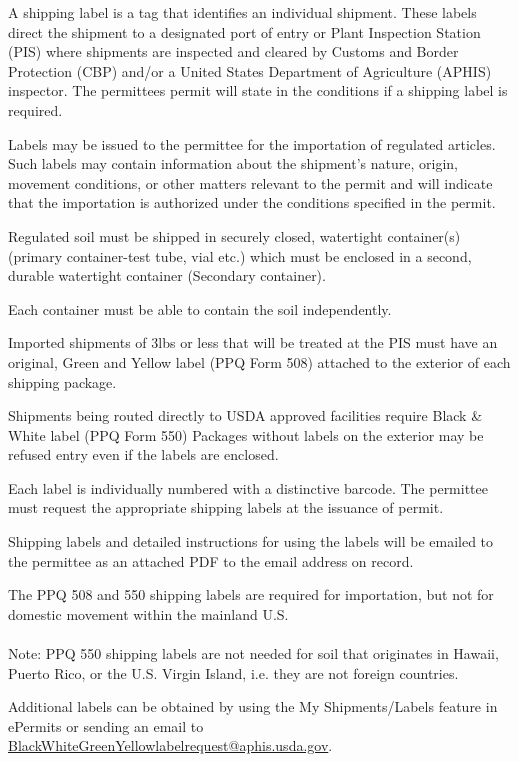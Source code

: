 \documentclass[12pt]{../SOP3}\usepackage[]{graphicx}\usepackage[]{color}
\begin{document}
\NP A shipping label is a tag that identifies an individual shipment. These labels direct the shipment to a designated port of entry or Plant Inspection Station (PIS) where shipments are inspected and cleared by Customs and Border Protection (CBP) and/or a United States Department of Agriculture (APHIS) inspector. The permittees permit will state in the conditions if a shipping label is required.

\NP Labels may be issued to the permittee for the importation of regulated articles. Such labels may contain information about the shipment's nature, origin, movement conditions, or other matters relevant to the permit and will indicate that the importation is authorized under the conditions specified in the permit.

\NP Regulated soil must be shipped in securely closed, watertight container(s) (primary container-test tube, vial etc.) which must be enclosed in a second, durable watertight container (Secondary container). 

\NP Each container must be able to contain the soil independently. 

\NP Imported shipments of 3lbs or less that will be treated at the PIS must have an original, Green and Yellow label (PPQ Form 508) attached to the exterior of each shipping package. 

\NP Shipments being routed directly to USDA approved facilities require Black \& White label (PPQ Form 550) Packages without labels on the exterior may be refused entry even if the labels are enclosed. 

\NP Each label is individually numbered with a distinctive barcode. The permittee must request the appropriate shipping labels at the issuance of permit. 

\NP Shipping labels and detailed instructions for using the labels will be emailed to the permittee as an attached PDF to the email address on record. 

\NP The PPQ 508 and 550 shipping labels are required for importation, but not for domestic movement within the mainland U.S. 
\\
\\
\noindent Note: PPQ 550 shipping labels are not needed for soil that originates in Hawaii, Puerto Rico, or the U.S. Virgin Island, i.e. they are not foreign countries.

\NP Additional labels can be obtained by using the My Shipments/Labels feature in ePermits or sending an email to \url{BlackWhiteGreenYellowlabelrequest@aphis.usda.gov}.
\end{document}
